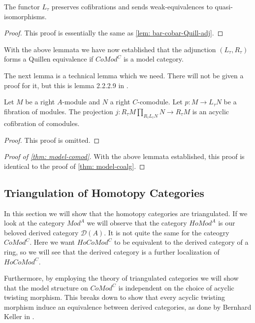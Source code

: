 \documentclass[../thesis.tex]{subfiles}
\begin{document}
            \begin{lemma}
                The functor $L_\tau$ preserves cofibrations and sends weak-equivalences to quasi-isomorphisms.
            \end{lemma}

            \begin{proof}
                This proof is essentially the same as \ref{lem: bar-cobar-Quill-adj}.
            \end{proof}

            With the above lemmata we have now established that the adjunction $(L_\tau, R_\tau)$ forms a Quillen equivalence if $CoMod^C$ is a model category.

            The next lemma is a technical lemma which we need. There will not be given a proof for it, but this is lemma 2.2.2.9 in \cite{LefevreHasegawa03}.

            \begin{lemma}
                Let $M$ be a right $A$-module and $N$ a right $C$-comodule. Let $p : M \rightarrow L_\tau N$ be a fibration of modules. The projection $j : R_\tau M \prod_{R_\tau L_\tau N} N \rightarrow R_\tau M$ is an acyclic cofibration of comodules.
            \end{lemma}

            \begin{proof}
                This proof is omitted.
            \end{proof}

            \begin{proof}[Proof of \ref{thm: model-comod}]
                With the above lemmata established, this proof is identical to the proof of \ref{thm: model-coalg}.
            \end{proof}

        \subsection{Triangulation of Homotopy Categories}
            In this section we will show that the homotopy categories are triangulated. If we look at the category $Mod^A$ we will observe that the category $HoMod^A$ is our beloved derived category $\mathcal{D}(A)$. It is not quite the same for the cateogry $CoMod^C$. Here we want $HoCoMod^C$ to be equivalent to the derived category of a ring, so we will see that the derived category is a further localization of $HoCoMod^C$.

            Furthermore, by employing the theory of triangulated categories we will show that the model structure on $CoMod^C$ is independent on the choice of acyclic twisting morphism. This breaks down to show that every acyclic twisting morphism induce an equivalence between derived categories, as done by Bernhard Keller in \cite{Keller94}.
\end{document}
